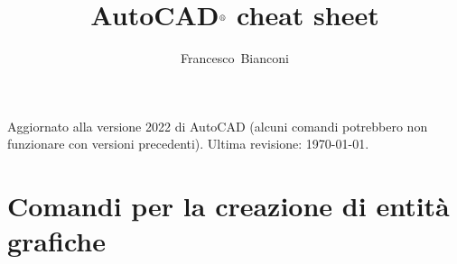 \documentclass[..]{../IEEEphot}
\begin{document}
\title{AutoCAD$^{\text{\textregistered}}$ cheat sheet}

\author{Francesco~Bianconi}


\maketitle
%
%
\thispagestyle{empty}

\vspace{-1.0cm}
\noindent Aggiornato alla versione 2022 di AutoCAD (alcuni comandi potrebbero non funzionare con versioni precedenti). Ultima revisione: \today.

\tableofcontents

\clearpage

\section{Comandi per la creazione di entità grafiche}
\end{document}
